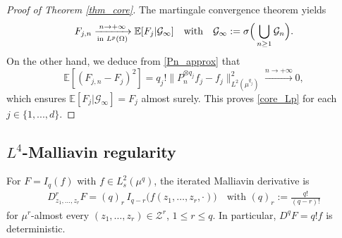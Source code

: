\documentclass[ECP,preprint]{ejpecp}
\newcommand{\E}{\mathbb{E}}
\newcommand{\cG}{\mathcal{G}}
\newcommand{\cZ}{\mathcal{Z}}
\begin{document}
\begin{proof}[Proof of Theorem \ref{thm_core}]
The martingale convergence theorem yields
\[
  F_{j,n}
  \xrightarrow[\text{in }L^p(\Omega)]{n\to+\infty} \E[F_j|\cG_\infty]
 \quad
 {\rm with}
 \quad
  \cG_\infty:=\sigma\Big(\bigcup_{n\geq1}\cG_n\Big).
\]
On the other hand, we deduce from \eqref{Pn_approx} that
\[
  \E[(F_{j,n}-F_j)^2]
  =q_j!\| P_n^{\otimes q_j}f_j-f_j \|_{L^2(\mu^{q_j})}^2
  \xrightarrow{n\to+\infty}0,
\]
which ensures  
$\E[F_j|\cG_\infty]=F_j$ almost surely.  This proves
\eqref{core_Lp} for each $j\in\{1, ..., d\}$.
\end{proof}

 



\subsection{\texorpdfstring{$L^4$-Malliavin regularity}{L4-Malliavin regularity}}
\label{SEC_23}

 


For $F=I_q(f)$ with $f\in L^2_s(\mu^q)$, the iterated Malliavin derivative is
\begin{align}
  D^r_{z_1,\ldots,z_r}F
  =(q)_r \, I_{q-r}\bigl(f(z_1,\ldots,z_r,\cdot)\bigr)
  \quad\text{with   $(q)_r:=\frac{q!}{(q-r)!}$}
  \label{iter_D}
\end{align}
for $\mu^r$-almost every $(z_1,\ldots,z_r)\in\cZ^r$,  $1\leq r\leq q$.
In particular,
$D^qF=q!f$ is deterministic.

 

 
\end{document}
